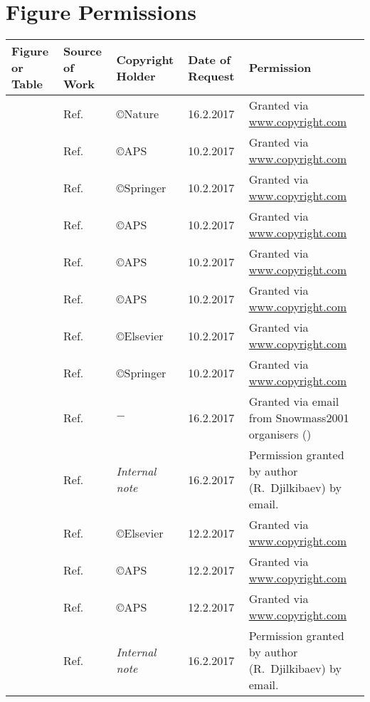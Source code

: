 \chapter{Figure Permissions}
\hspace{-1ex}\begin{tabular}{L{0.11\textwidth}L{0.1\textwidth}L{0.12\textwidth}L{0.12\textwidth}L{0.45\textwidth}}
\hline
Figure or Table & Source of Work & Copyright Holder & Date of Request & Permission \\ 
\hline
{} & Ref.~\cite{Williams1940102}   & \copyright Nature   & 16.2.2017 & Granted via \url{www.copyright.com}\\
      & Ref.~\cite{Hincks194802}      & \copyright APS      & 10.2.2017 & Granted via \url{www.copyright.com}\\
            & Ref.~\cite{Hartmann:1982uk}   & \copyright Springer & 10.2.2017 & Granted via \url{www.copyright.com}\\
                & Ref.~\cite{Czarnecki2011}     & \copyright APS      & 10.2.2017 & Granted via \url{www.copyright.com}\\
        & Ref.~\cite{Krane:1979wt}      & \copyright APS      & 10.2.2017 & Granted via \url{www.copyright.com}\\
     & Ref.~\cite{Sobottka1968}      & \copyright APS      & 10.2.2017 & Granted via \url{www.copyright.com}\\
   & Ref.~\cite{Wyttenbach:1978rp} & \copyright Elsevier & 10.2.2017 & Granted via \url{www.copyright.com}\\
            & Ref.~\cite{sindrum2006}       & \copyright Springer & 10.2.2017 & Granted via \url{www.copyright.com}\\
                    & Ref.~\cite{MECO}              &  $-$     & 16.2.2017 & Granted via email from Snowmass2001 organisers () \\
        & Ref.~\cite{Meco023}           &  \emph{Internal note}     & 16.2.2017 &Permission granted by author (R.\ Djilkibaev) by email. \\
          & Ref.~\cite{T2K:nim}           & \copyright Elsevier & 12.2.2017 & Granted via \url{www.copyright.com}\\
      & Ref.~\cite{RevModPhys.76.31}  & \copyright APS      & 12.2.2017 & Granted via \url{www.copyright.com}\\
             & Ref.~\cite{Bistirlich:1972jy} & \copyright APS      & 12.2.2017 & Granted via \url{www.copyright.com}\\
   & Ref.~\cite{Meco024}           &  \emph{Internal note}     & 16.2.2017 & Permission granted by author (R.\ Djilkibaev) by email.\\
\hline
\end{tabular}

